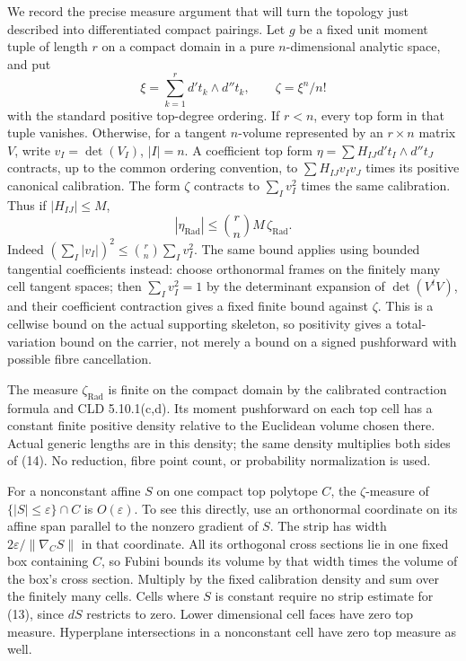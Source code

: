 \documentclass[
  11pt,
]{article}
\begin{document}
We record the precise measure argument that will turn the topology just
described into differentiated compact pairings. Let \(g\) be a fixed
unit moment tuple of length \(r\) on a compact domain in a pure
\(n\)-dimensional analytic space, and put \[
 \xi=\sum_{k=1}^r d't_k\wedge d''t_k,\qquad
 \zeta=\xi^n/n!
\] with the standard positive top-degree ordering. If \(r<n\), every top
form in that tuple vanishes. Otherwise, for a tangent \(n\)-volume
represented by an \(r\times n\) matrix \(V\), write \(v_I=\det(V_I)\),
\(|I|=n\). A coefficient top form \(\eta=\sum H_{IJ}d't_I\wedge d''t_J\)
contracts, up to the common ordering convention, to
\(\sum H_{IJ}v_Iv_J\) times its positive canonical calibration. The form
\(\zeta\) contracts to \(\sum_Iv_I^2\) times the same calibration. Thus
if \(|H_{IJ}|\leq M\), \[
 |\eta_{\mathrm{Rad}}|
      \leq {r\choose n}M\,\zeta_{\mathrm{Rad}}.             \tag{14}
\] Indeed \((\sum_I|v_I|)^2\leq {r\choose n}\sum_Iv_I^2\). The same
bound applies using bounded tangential coefficients instead: choose
orthonormal frames on the finitely many cell tangent spaces; then
\(\sum_Iv_I^2=1\) by the determinant expansion of \(\det(V^tV)\), and
their coefficient contraction gives a fixed finite bound against
\(\zeta\). This is a cellwise bound on the actual supporting skeleton,
so positivity gives a total-variation bound on the carrier, not merely a
bound on a signed pushforward with possible fibre cancellation.

The measure \(\zeta_{\mathrm{Rad}}\) is finite on the compact domain by
the calibrated contraction formula and CLD 5.10.1(c,d). Its moment
pushforward on each top cell has a constant finite positive density
relative to the Euclidean volume chosen there. Actual generic lengths
are in this density; the same density multiplies both sides of (14). No
reduction, fibre point count, or probability normalization is used.

For a nonconstant affine \(S\) on one compact top polytope \(C\), the
\(\zeta\)-measure of \(\{|S|\leq\varepsilon\}\cap C\) is
\(O(\varepsilon)\). To see this directly, use an orthonormal coordinate
on its affine span parallel to the nonzero gradient of \(S\). The strip
has width \(2\varepsilon/\|\nabla_C S\|\) in that coordinate. All its
orthogonal cross sections lie in one fixed box containing \(C\), so
Fubini bounds its volume by that width times the volume of the box's
cross section. Multiply by the fixed calibration density and sum over
the finitely many cells. Cells where \(S\) is constant require no strip
estimate for (13), since \(dS\) restricts to zero. Lower dimensional
cell faces have zero top measure. Hyperplane intersections in a
nonconstant cell have zero top measure as well.
\end{document}
